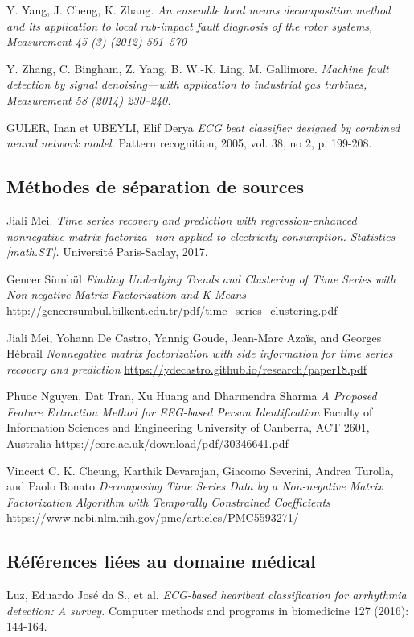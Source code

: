 \begin{thebibliography}{1}
Y. Yang, J. Cheng, K. Zhang.
\emph{An ensemble local means decomposition method and its application to local rub-impact fault
diagnosis of the rotor systems, Measurement 45 (3) (2012) 561–570}


 Y. Zhang, C. Bingham, Z. Yang, B. W.-K. Ling, M. Gallimore.
 \emph{Machine fault detection by signal denoising—with application to
industrial gas turbines, Measurement 58 (2014) 230–240.}

GULER, Inan et UBEYLI, Elif Derya
\emph{ECG beat classifier designed by combined neural network model.}
 Pattern recognition, 2005, vol. 38, no 2, p. 199-208.
 

\subsection*{Méthodes de séparation de sources}
Jiali Mei.
\emph{Time series recovery and prediction with regression-enhanced nonnegative matrix factoriza-
tion applied to electricity consumption. Statistics [math.ST].} Université Paris-Saclay, 2017.

Gencer Sümbül
\emph{Finding Underlying Trends and Clustering of Time Series with Non-negative Matrix Factorization and K-Means}
\url{http://gencersumbul.bilkent.edu.tr/pdf/time_series_clustering.pdf}

Jiali Mei, Yohann De Castro, Yannig Goude, Jean-Marc Azaïs, and Georges Hébrail
\emph{Nonnegative matrix factorization with side information for time series recovery and prediction}
\url{https://ydecastro.github.io/research/paper18.pdf}

Phuoc Nguyen, Dat Tran, Xu Huang and Dharmendra Sharma
\emph{A Proposed Feature Extraction Method for EEG-based Person Identification} 
Faculty of Information Sciences and Engineering University of Canberra, ACT 2601, Australia 
\url{https://core.ac.uk/download/pdf/30346641.pdf}

Vincent C. K. Cheung, Karthik Devarajan, Giacomo Severini, Andrea Turolla, and Paolo Bonato
\emph{Decomposing Time Series Data by a Non-negative Matrix Factorization Algorithm with Temporally Constrained Coefficients}
\url{https://www.ncbi.nlm.nih.gov/pmc/articles/PMC5593271/}


\subsection*{Références liées au domaine médical}
Luz, Eduardo José da S., et al. 
\emph{ECG-based heartbeat classification for arrhythmia detection: A survey.} Computer methods and programs in biomedicine 127 (2016): 144-164.


\end{thebibliography}
